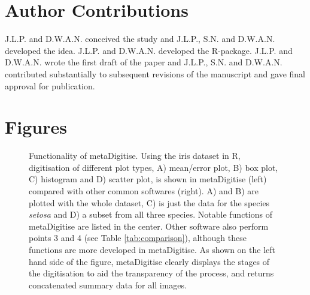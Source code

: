 \documentclass[12pt]{article}
\newcommand{\pkg}[1]{{\fontseries{b}\selectfont #1}}
\begin{document}
\section*{Author Contributions}
J.L.P. and D.W.A.N. conceived the study and J.L.P., S.N. and D.W.A.N. developed the idea. J.L.P. and D.W.A.N. developed the R-package. J.L.P. and D.W.A.N. wrote the first draft of the paper and J.L.P., S.N. and D.W.A.N. contributed substantially to subsequent revisions of the manuscript and gave final approval for publication.





\clearpage
\section*{Figures}

\begin{figure}[!h]
\centering 
{}
 \caption{%
Functionality of \pkg{metaDigitise}. Using the iris dataset in R, digitisation of different plot types, A) mean/error plot, B) box plot, C) histogram and D) scatter plot, is shown in \pkg{metaDigitise} (left) compared with other common softwares (right). A) and B) are plotted with the whole dataset, C) is just the data for the species \textit{setosa} and D) a subset from all three species. Notable functions of metaDigitise are listed in the center. Other software also perform points 3 and 4 (see Table \ref{tab:comparison}), although these functions are more developed in \pkg{metaDigitise}. As shown on the left hand side of the figure, \pkg{metaDigitise} clearly displays the stages of the digitisation to aid the transparency of the process, and returns concatenated summary data for all images.
}
\label{fig:all_extract}
\end{figure}
\end{document}
